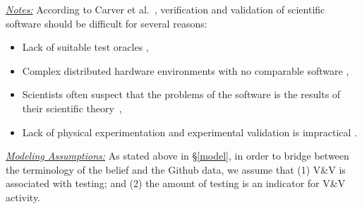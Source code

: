 \documentclass[sigconf,review,anonymous]{acmart}
\newcommand{\bi}{\begin{itemize}}
\newcommand{\ei}{\end{itemize}}
\begin{document}
\noindent \textit{\underline{Notes:}} 
According to Carver et al.~\cite{carver07_environment},
verification and validation of scientific software should be difficult for several reasons:
\bi
  \item Lack of suitable test oracles \cite{kanewala13_testing},
  \item Complex distributed hardware environments with no comparable software \cite{basili08_hpc},
  \item Scientists often suspect that the problems of the software is the results of their scientific theory~\cite{faulk09_secs},
  \item Lack of physical experimentation and experimental validation is impractical \cite{carver07_environment}. 
\ei



\noindent\textit{\underline{Modeling Assumptions:}} 
As stated above in \S\ref{model},
in order to bridge between the terminology of the belief and the Github data, we assume that (1) V\&V is associated with testing; and (2) the amount of testing is an indicator for V\&V activity.
\end{document}
